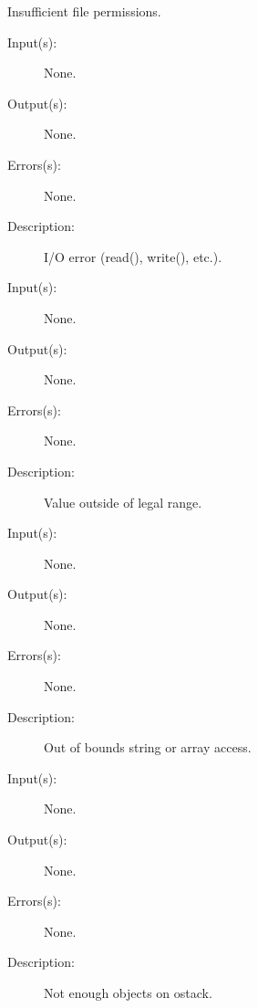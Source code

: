 \begin{description}
\begin{description}
		Insufficient file permissions.
	\end{description}
\label{ioerror}
\label{errordict:ioerror}
\item[{\onyxop{--}{ioerror}{--}}: ]
	\begin{description}\item[]
	\item[Input(s): ] None.
	\item[Output(s): ] None.
	\item[Errors(s): ] None.
	\item[Description: ]
		I/O error (read(), write(), etc.).
	\end{description}
\label{limitcheck}
\label{errordict:limitcheck}
\item[{\onyxop{--}{limitcheck}{--}}: ]
	\begin{description}\item[]
	\item[Input(s): ] None.
	\item[Output(s): ] None.
	\item[Errors(s): ] None.
	\item[Description: ]
		Value outside of legal range.
	\end{description}
\label{rangecheck}
\label{errordict:rangecheck}
\item[{\onyxop{--}{rangecheck}{--}}: ]
	\begin{description}\item[]
	\item[Input(s): ] None.
	\item[Output(s): ] None.
	\item[Errors(s): ] None.
	\item[Description: ]
		Out of bounds string or array access.
	\end{description}
\label{stackunderflow}
\label{errordict:stackunderflow}
\item[{\onyxop{--}{stackunderflow}{--}}: ]
	\begin{description}\item[]
	\item[Input(s): ] None.
	\item[Output(s): ] None.
	\item[Errors(s): ] None.
	\item[Description: ]
		Not enough objects on ostack.
	\end{description}

\end{description}
